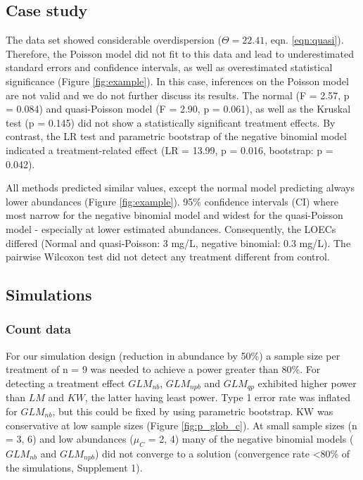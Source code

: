 \documentclass[twocolumn, natbib]{svjour3}
\begin{document}
\subsection{Case study}
The data set showed considerable overdispersion ($\Theta = 22.41$, eqn. \ref{eqn:quasi}).
Therefore, the Poisson model did not fit to this data and lead to underestimated standard errors and confidence intervals, as well as overestimated statistical significance (Figure \ref{fig:example}).
In this case, inferences on the Poisson model are not valid and we do not further discuss its results.
The normal (F = 2.57, p = 0.084) and quasi-Poisson model (F = 2.90, p = 0.061), as well as the Kruskal test (p =  0.145) did not show a statistically significant treatment effects.
By contrast, the LR test and parametric bootstrap of the negative binomial model indicated a treatment-related effect (LR = 13.99, p = 0.016, bootstrap: p = 0.042).

All methods predicted similar values, except the normal model predicting always lower abundances (Figure \ref{fig:example}). 
95\% confidence intervals (CI) where most narrow for the negative binomial model and widest for the quasi-Poisson model - especially at lower estimated abundances.
Consequently, the LOECs differed (Normal and quasi-Poisson: 3 mg/L, negative binomial: 0.3 mg/L).
The pairwise Wilcoxon test did not detect any treatment different from control.


\subsection{Simulations}
\subsubsection{Count data}
For our simulation design (reduction in abundance by 50\%) a sample size per treatment of n = 9 was needed to achieve a power greater than 80\%.
For detecting a treatment effect $GLM_{nb}$, $GLM_{npb}$ and $GLM_{qp}$ exhibited higher power than $LM$ and $KW$, the latter having least power.
Type 1 error rate was inflated for $GLM_{nb}$, but this could be fixed by using parametric bootstrap.
KW was conservative at low sample sizes (Figure \ref{fig:p_glob_c}).
At small sample sizes (n = {3, 6}) and low abundances ($\mu_C$ = {2, 4}) many of the negative binomial models ($GLM_{nb}$ and $GLM_{npb}$) did not converge to a solution (convergence rate \textless 80\% of the simulations, Supplement 1). 
\end{document}
